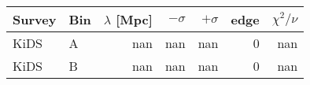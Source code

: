 \begin{longtable}{llrrrrr}\toprule
Survey & Bin & $\lambda$ [Mpc] & $-\sigma$ & $+\sigma$ & edge & $\chi^2/\nu$\\\midrule
KiDS & A & nan & nan & nan & 0 & nan\\
KiDS & B & nan & nan & nan & 0 & nan\\
\bottomrule\end{longtable}
